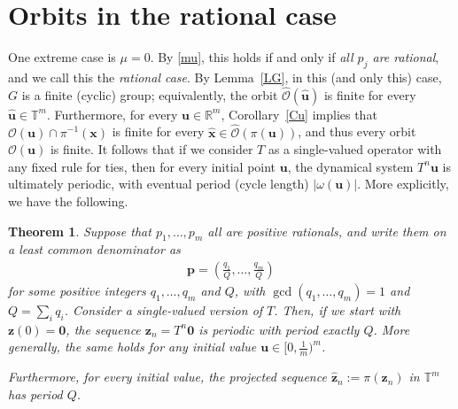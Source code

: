 \documentclass[11pt,reqno,tbtags,a4paper]{amsart}
\numberwithin{equation}{section}
\theoremstyle{plain}%
\newtheorem{theorem}{Theorem}[section]
\theoremstyle{definition}
\theoremstyle{remark}
\newcommand{\refC}[1]{Corollary~\ref{#1}}
\newcommand{\refL}[1]{Lemma~\ref{#1}}
\newcommand\lrpar[1]{\left(#1\right)}
\newcommand\bbR{\mathbb R}
\newcommand\bbT{\mathbb T}
\newcommand\gO{\hat{\cO}}
\newcommand\cL{{\omega}}
\newcommand\cO{\mathcal O}
\newcommand\qw{^{-1}}
\newcommand\vp{\mathbf{p}}
\newcommand\vu{\mathbf{u}}
\newcommand\hvu{{\hat{\mathbf{u}}}}
\newcommand\vx{\mathbf{x}}
\newcommand\vz{\mathbf{z}}
\newcommand\hvx{\hat{\mathbf{x}}}
\newcommand\hvz{\hat{\mathbf{z}}}
\newcommand\0{{\boldsymbol 0}}
\newcommand\1{{\boldsymbol 1}}
\begin{document}
\section{Orbits in the rational case}
\label{Srational}

One extreme case is  $\mu=0$. By \eqref{mu}, this holds if and only if
\emph{all $p_j$ are rational}, and 
we call this the \emph{rational case}. 
By \refL{LG}, in this (and only this) case, $G$ is a finite (cyclic) group;
equivalently, the orbit $\gO(\hvu)$ is finite for every $\hvu\in\bbT^m$.
Furthermore, for every $\vu\in\bbR^m$,
\refC{Cu} implies that 
$\cO(\vu)\cap\pi\qw(\vx)$ is finite
for every $\hvx\in \gO(\pi(\vu))$,
and thus every orbit $\cO(\vu)$ is finite. 
It follows that if we consider $T$ as a single-valued operator with any
fixed rule for ties, then for every initial point $\vu$, the dynamical system
$T^n\vu$ is ultimately periodic, with eventual period (cycle length) $|\cL(\vu)|$.
More explicitly, we have the following.

\begin{theorem}\label{TQ}
  Suppose that $p_1,\dots,p_m$ all are positive rationals, and write
  them on a least common denominator as
  \begin{align}\label{tq}
    \vp=\lrpar{\frac{q_1}{Q},\dots,\frac{q_m}Q}
  \end{align}
for some positive integers $q_1,\dots,q_m$ and $Q$, with 
%
$\gcd(q_1,\dots,q_m)=1$
and $Q=\sum_i q_i$.
%
Consider a single-valued version of $T$.
Then, if we start with $\vz(0)=\0$, the sequence $\vz_n=T^n\0$ is periodic
with period exactly $Q$. More generally, the same holds for any initial
value $\vu\in[0,\frac1m)^m$.
%
%
%

Furthermore, 
for every initial value,
the projected 
%
sequence $\hvz_n:=\pi(\vz_n)$ in $\bbT^m$ has period $Q$.
\end{theorem}
\end{document}
